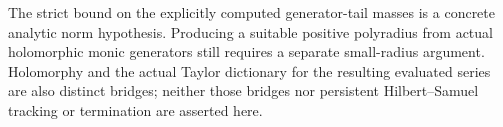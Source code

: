 \begin{remark}
The strict bound on the explicitly computed generator-tail masses is a concrete analytic norm hypothesis. Producing a suitable positive polyradius from actual holomorphic monic generators still requires a separate small-radius argument. Holomorphy and the actual Taylor dictionary for the resulting evaluated series are also distinct bridges; neither those bridges nor persistent Hilbert--Samuel tracking or termination are asserted here.
\end{remark}
